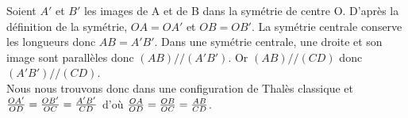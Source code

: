 
Soient $ A'$ et $ B'$ les images de A et de B
dans la symétrie de centre O.
D'après la définition de la symétrie, $ OA= OA'$
 et $ OB= OB'$. La symétrie centrale conserve les
longueurs donc $ AB= A'B'$.
Dans une symétrie centrale, une droite et son image sont parallèles donc 
$( AB)//( A'B')$.
Or $( AB)//( CD)$ donc $( A'B')//(CD)$.\\
Nous nous trouvons donc dans une configuration de Thalès classique et
${OA'\over OD}={OB'\over OC}={A'B'\over CD}$ d'où
${OA\over OD}={OB\over OC}={AB\over CD}$.
